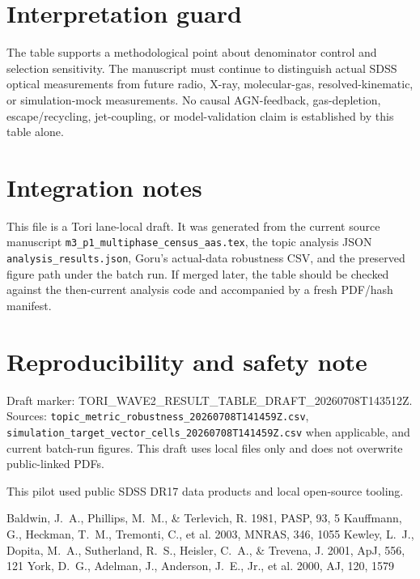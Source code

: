 \documentclass[twocolumn]{aastex631}
\begin{document}
    \section{Interpretation guard}
    The table supports a methodological point about denominator control and selection sensitivity.  The manuscript must continue to distinguish actual SDSS optical measurements from future radio, X-ray, molecular-gas, resolved-kinematic, or simulation-mock measurements.  No causal AGN-feedback, gas-depletion, escape/recycling, jet-coupling, or model-validation claim is established by this table alone.

    \section{Integration notes}
    This file is a Tori lane-local draft.  It was generated from the current source manuscript \texttt{m3\_p1\_multiphase\_census\_aas.tex}, the topic analysis JSON \texttt{analysis\_results.json}, Goru's actual-data robustness CSV, and the preserved figure path under the batch run.  If merged later, the table should be checked against the then-current analysis code and accompanied by a fresh PDF/hash manifest.

    \section*{Reproducibility and safety note}
    Draft marker: TORI\_WAVE2\_RESULT\_TABLE\_DRAFT\_20260708T143512Z.  Sources: \texttt{topic\_metric\_robustness\_20260708T141459Z.csv}, \texttt{simulation\_target\_vector\_cells\_20260708T141459Z.csv} when applicable, and current batch-run figures.  This draft uses local files only and does not overwrite public-linked PDFs.

    \acknowledgments
    This pilot used public SDSS DR17 data products and local open-source tooling.

    \begin{thebibliography}{}
     Baldwin, J.~A., Phillips, M.~M., \& Terlevich, R. 1981, PASP, 93, 5
     Kauffmann, G., Heckman, T.~M., Tremonti, C., et al. 2003, MNRAS, 346, 1055
     Kewley, L.~J., Dopita, M.~A., Sutherland, R.~S., Heisler, C.~A., \& Trevena, J. 2001, ApJ, 556, 121
     York, D.~G., Adelman, J., Anderson, J.~E., Jr., et al. 2000, AJ, 120, 1579
    \end{thebibliography}

    
\end{document}
